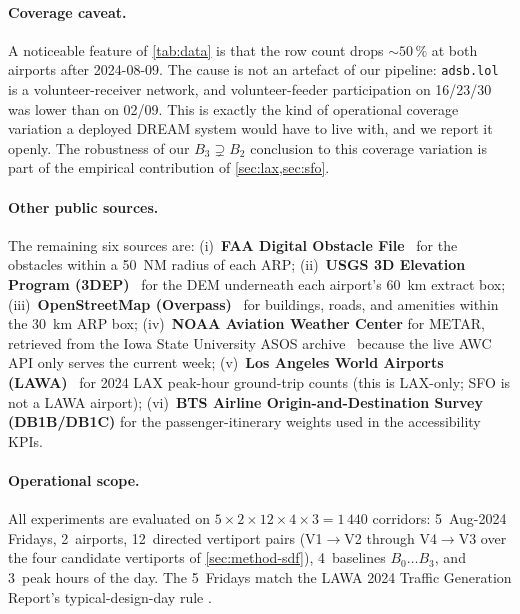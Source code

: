 

\paragraph{Coverage caveat.}
A noticeable feature of \cref{tab:data} is that the row count drops
$\sim 50\,\%$ at both airports after 2024-08-09. The cause is not an artefact
of our pipeline: \texttt{adsb.lol} is a volunteer-receiver network, and
volunteer-feeder participation on 16/23/30 was lower than on 02/09. This is
exactly the kind of operational coverage variation a deployed DREAM system
would have to live with, and we report it openly. The robustness of our
$B_3 \supsetneq B_2$ conclusion to this coverage variation is part of the
empirical contribution of \cref{sec:lax,sec:sfo}.

\paragraph{Other public sources.}
The remaining six sources are:
(i)~\textbf{FAA Digital Obstacle File}~\citep{faa_dof} for the obstacles
within a 50~NM radius of each ARP;
(ii)~\textbf{USGS 3D Elevation Program (3DEP)}~\citep{usgs_3dep} for the DEM
underneath each airport's 60~km extract box;
(iii)~\textbf{OpenStreetMap (Overpass)}~\citep{osm} for buildings, roads, and
amenities within the 30~km ARP box;
(iv)~\textbf{NOAA Aviation Weather Center} for METAR, retrieved from the
Iowa State University ASOS archive~\citep{iastate_asos} because the live
AWC API only serves the current week;
(v)~\textbf{Los Angeles World Airports (LAWA)}~\citep{lawa2024} for
2024 LAX peak-hour ground-trip counts (this is LAX-only; SFO is not a LAWA
airport);
(vi)~\textbf{BTS Airline Origin-and-Destination Survey (DB1B/DB1C)} for the
passenger-itinerary weights used in the accessibility KPIs.

\paragraph{Operational scope.}
All experiments are evaluated on $5 \times 2 \times 12 \times 4 \times 3 =
1\,440$ corridors: 5~Aug-2024 Fridays, 2~airports, 12~directed vertiport
pairs (V1$\rightarrow$V2 through V4$\rightarrow$V3 over the four candidate
vertiports of \cref{sec:method-sdf}), 4~baselines $B_0\ldots B_3$, and
3~peak hours of the day. The 5~Fridays match the LAWA 2024 Traffic
Generation Report's typical-design-day rule
\citep{lawa2024}.
